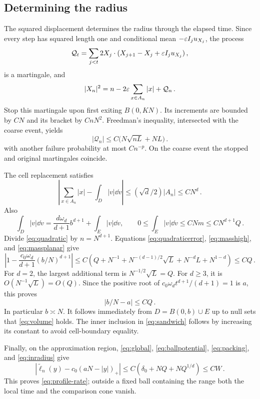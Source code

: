\subsection{Determining the radius}
The squared displacement determines the radius through the elapsed time.
Since every step has squared length one and conditional mean
$-\varepsilon I_ju_{X_j}$, the process
\[
\mathcal Q_t=\sum_{j<t}2X_j\cdot(X_{j+1}-X_j+\varepsilon I_ju_{X_j})\, ,
\]
is a martingale, and
\begin{equation}\label{eq:quadratic}
 |X_n|^2=n-2\varepsilon\sum_{x\in A_n}|x|+\mathcal Q_n\, .
\end{equation}
Stop this martingale upon first exiting $B(0,KN)$. Its increments are bounded by $CN$ and its
bracket by $CnN^2$. Freedman's inequality, intersected with the
coarse event, yields
\begin{equation}\label{eq:quadraticerror}
 |\mathcal Q_n|\leq C\big(N\sqrt{nL}+NL\big)\, .
\end{equation}
with another failure probability at most $Cn^{-p}$.
On the coarse event the stopped and original martingales coincide.

The cell replacement satisfies
\[
 \left|\sum_{x\in A_n}|x|-\int_D|v|\dd v\right|
 \leq (\sqrt d/2)|A_n|\leq CN^d\, .
\]
Also
\[
 \int_D|v|\dd v
 =\frac{d\omega_d}{d+1}b^{d+1}+\int_E|v|\dd v,
 \qquad 0\leq\int_E|v|\dd v\leq CNm\leq CN^{d+1}Q\, .
\]
Divide \eqref{eq:quadratic} by $n=N^{d+1}$. Equations
\eqref{eq:quadraticerror}, \eqref{eq:masshigh}, and \eqref{eq:massplanar} give
\[
 \left|1-\frac{c_0\omega_d}{d+1}(b/N)^{d+1}\right|
 \leq C\left(Q+N^{-1}+N^{-(d-1)/2}\sqrt L
                         +N^{-d}L+N^{1-d}\right)
 \leq CQ\, .
\]
For $d=2$, the largest additional term is $N^{-1/2}\sqrt L=Q$.
For $d\geq3$, it is $O(N^{-1}\sqrt L)=O(Q)$.
Since the positive root of
$c_0\omega_d t^{d+1}/(d+1)=1$ is $a$, this proves
\begin{equation}\label{eq:inradius}
 |b/N-a|\leq CQ\, .
\end{equation}
In particular $b\asymp N$. It follows immediately from
$D=B(0,b)\cup E$ up to null sets that \eqref{eq:volume} holds.
The inner inclusion in \eqref{eq:sandwich} follows by increasing its
constant to avoid cell-boundary equality.

Finally, on the approximation region, \eqref{eq:global},
\eqref{eq:ballpotential}, \eqref{eq:packing}, and \eqref{eq:inradius} give
\[
 \left|\widetilde\ell_n(y)-c_0(aN-|y|)_+\right|
 \leq C(\delta_0+NQ+NQ^{1/d})\leq CW\, .
\]
This proves \eqref{eq:profile-rate}; outside a fixed ball containing the range
both the local time and the comparison cone vanish.

